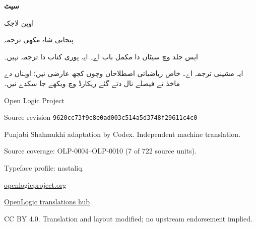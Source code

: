 \documentclass[12pt,a4paper,oneside,openany]{book}
\begin{document}
\begin{titlepage}
\begin{Arabic}
\centering
\vspace*{18mm}
{\Huge\bfseries سیٹ\par}
\vspace{8mm}
{\LARGE اوپن لاجک\par}
\vspace{5mm}
{\Large پنجابی شاہ مکھی ترجمہ\par}
\vspace{16mm}
ایس جلد وچ سیٹاں دا مکمل باب اے۔ ایہ پوری کتاب دا ترجمہ نہیں۔
\par
ایہ مشینی ترجمہ اے۔ خاص ریاضیاتی اصطلاحاں وچوں کجھ عارضی نیں؛
اوہناں دے ماخذ تے فیصلے نال دتے گئے ریکارڈ وچ ویکھے جا سکدے نیں۔
\vfill
\end{Arabic}
\begin{center}
Open Logic Project\par
Source revision \texttt{9620cc73f9c8e0ad003c514a5d3748f29611c4c0}\par
Punjabi Shahmukhi adaptation by Codex. Independent machine translation.\par
Source coverage: OLP-0004--OLP-0010 (7 of 722 source units).\par
Typeface profile: nastaliq.\par
\href{https://openlogicproject.org/}{openlogicproject.org}\par
\href{https://github.com/KokunoYumeto/OpenLogic-translations}{OpenLogic translations hub}\par
CC BY 4.0. Translation and layout modified; no upstream endorsement implied.
\end{center}
\end{titlepage}
\mainmatter
\end{document}
